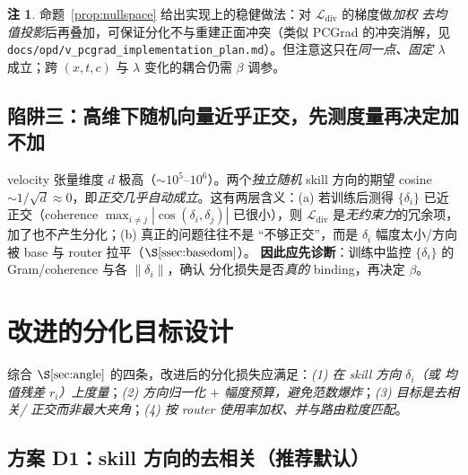 \documentclass[11pt,a4paper]{article}
\newcommand{\loss}{\mathcal{L}}
\theoremstyle{definition}
\newtheorem{remark}{注}
\begin{document}
\begin{remark}
命题~\ref{prop:nullspace} 给出实现上的稳健做法：对 $\loss_{\mathrm{div}}$ 的梯度做\emph{加权
去均值投影}后再叠加，可保证分化不与重建正面冲突（类似 PCGrad 的冲突消解，见
\texttt{docs/opd/v\_pcgrad\_implementation\_plan.md}）。但注意这只在\emph{同一点、固定 $\lambda$}
成立；跨 $(x,t,c)$ 与 $\lambda$ 变化的耦合仍需 $\beta$ 调参。
\end{remark}

\subsection{陷阱三：高维下随机向量近乎正交，先测度量再决定加不加}
\label{ssec:highdim}

velocity 张量维度 $d$ 极高（$\sim10^5$--$10^6$）。两个\emph{独立随机} skill 方向的期望 cosine
$\sim1/\sqrt d\approx0$，即\emph{正交几乎自动成立}。这有两层含义：(a) 若训练后测得
$\{\delta_i\}$ 已近正交（coherence $\max_{i\neq j}|\cos(\delta_i,\delta_j)|$ 已很小），则
$\loss_{\mathrm{div}}$ 是\emph{无约束力}的冗余项，加了也不产生分化；(b) 真正的问题往往不是
``不够正交''，而是 $\delta_i$ 幅度太小/方向被 base 与 router 拉平（$\S\ref{ssec:basedom}$）。
\textbf{因此应先诊断}：训练中监控 $\{\delta_i\}$ 的 Gram/coherence 与各 $\|\delta_i\|$，确认
分化损失是否\emph{真的} binding，再决定 $\beta$。

\section{改进的分化目标设计}
\label{sec:design}

综合 $\S\ref{sec:angle}$ 的四条，改进后的分化损失应满足：\emph{(1) 在 skill 方向 $\delta_i$（或
均值残差 $r_i$）上度量}；\emph{(2) 方向归一化 $+$ 幅度预算，避免范数爆炸}；\emph{(3) 目标是去相关/
正交而非最大夹角}；\emph{(4) 按 router 使用率加权、并与路由粒度匹配}。

\subsection{方案 D1：skill 方向的去相关（推荐默认）}
\label{ssec:d1}
\end{document}
